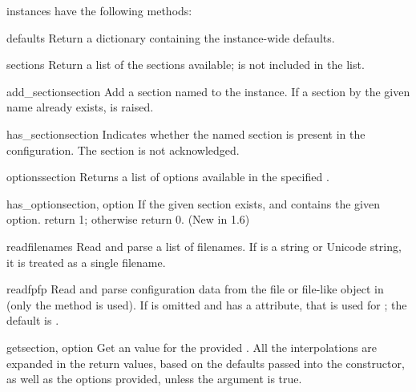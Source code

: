  instances have the following methods:

\begin{methoddesc}{defaults}{}
Return a dictionary containing the instance-wide defaults.
\end{methoddesc}

\begin{methoddesc}{sections}{}
Return a list of the sections available;  is not
included in the list.
\end{methoddesc}

\begin{methoddesc}{add_section}{section}
Add a section named  to the instance.  If a section by
the given name already exists,  is
raised.
\end{methoddesc}

\begin{methoddesc}{has_section}{section}
Indicates whether the named section is present in the
configuration. The  section is not acknowledged.
\end{methoddesc}

\begin{methoddesc}{options}{section}
Returns a list of options available in the specified .
\end{methoddesc}

\begin{methoddesc}{has_option}{section, option}
If the given section exists, and contains the given option. return 1;
otherwise return 0. (New in 1.6)
\end{methoddesc}

\begin{methoddesc}{read}{filenames}
Read and parse a list of filenames.  If  is a string or
Unicode string, it is treated as a single filename.
\end{methoddesc}

\begin{methoddesc}{readfp}{fp}
Read and parse configuration data from the file or file-like object in
 (only the  method is used).  If
 is omitted and  has a  attribute,
that is used for ; the default is .
\end{methoddesc}

\begin{methoddesc}{get}{section, option}
Get an  value for the provided .  All the
\character{\%} interpolations are expanded in the return values, based on
the defaults passed into the constructor, as well as the options
 provided, unless the  argument is true.
\end{methoddesc}

